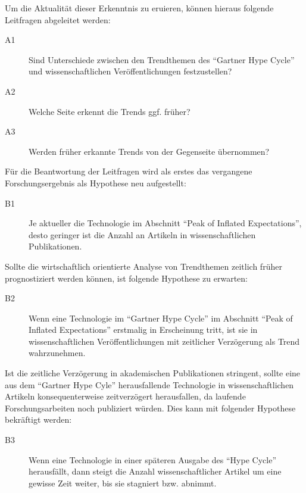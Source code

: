 Um die Aktualität dieser Erkenntnis zu eruieren, können hieraus folgende Leitfragen abgeleitet werden:

\begin{description}
	\item[A1] Sind Unterschiede zwischen den Trendthemen des "`Gartner Hype Cycle"' und wissenschaftlichen Veröffentlichungen festzustellen?
	\item[A2] Welche Seite erkennt die Trends ggf. früher?
	\item[A3] Werden früher erkannte Trends von der Gegenseite übernommen?
\end{description}

Für die Beantwortung der Leitfragen wird als erstes das vergangene Forschungsergebnis als Hypothese neu aufgestellt:

\begin{description}
	\item[B1] Je aktueller die Technologie im Abschnitt "`Peak of Inflated Expectations"', desto geringer ist die Anzahl an Artikeln in wissenschaftlichen Publikationen.
\end{description}

Sollte die wirtschaftlich orientierte Analyse von Trendthemen zeitlich früher prognostiziert werden können, ist folgende Hypothese zu erwarten:

\begin{description}
\item[B2] Wenn eine Technologie im "`Gartner Hype Cycle"' im Abschnitt "`Peak of Inflated Expectations"' erstmalig in Erscheinung tritt, ist sie in wissenschaftlichen Veröffentlichungen mit zeitlicher Verzögerung als Trend wahrzunehmen.
\end{description}

Ist die zeitliche Verzögerung in akademischen Publikationen stringent, sollte eine aus dem "`Gartner Hype Cyle"' herausfallende Technologie in wissenschaftlichen Artikeln konsequenterweise zeitverzögert herausfallen, da laufende Forschungsarbeiten noch publiziert würden. Dies kann mit folgender Hypothese bekräftigt werden:

\begin{description}
	\item[B3] Wenn eine Technologie in einer späteren Ausgabe des "`Hype Cycle"' herausfällt, dann steigt die Anzahl wissenschaftlicher Artikel um eine gewisse Zeit weiter, bis sie stagniert bzw. abnimmt.
\end{description}

